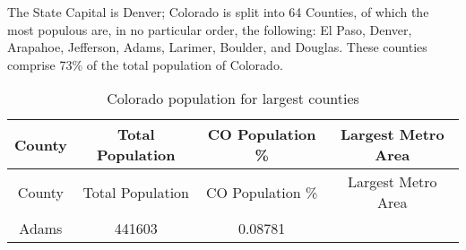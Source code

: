 \documentclass[12pt,twoside]{reedthesis}
\begin{document}
  The State Capital is Denver; Colorado is split into 64 Counties, of
  which the most populous are, in no particular order, the following: El
  Paso, Denver, Arapahoe, Jefferson, Adams, Larimer, Boulder, and Douglas.
  These counties comprise 73\% of the total population of Colorado.
  
  \begin{longtable}[]{@{}cccc@{}}
  \caption{Colorado population for largest counties
  \label{tab:pop_table}}\tabularnewline
  \toprule
  \begin{minipage}[b]{0.13\columnwidth}\centering\strut
  County\strut
  \end{minipage} & \begin{minipage}[b]{0.21\columnwidth}\centering\strut
  Total Population\strut
  \end{minipage} & \begin{minipage}[b]{0.20\columnwidth}\centering\strut
  CO Population \%\strut
  \end{minipage} & \begin{minipage}[b]{0.34\columnwidth}\centering\strut
  Largest Metro Area\strut
  \end{minipage}\tabularnewline
  \midrule
  \endfirsthead
  \toprule
  \begin{minipage}[b]{0.13\columnwidth}\centering\strut
  County\strut
  \end{minipage} & \begin{minipage}[b]{0.21\columnwidth}\centering\strut
  Total Population\strut
  \end{minipage} & \begin{minipage}[b]{0.20\columnwidth}\centering\strut
  CO Population \%\strut
  \end{minipage} & \begin{minipage}[b]{0.34\columnwidth}\centering\strut
  Largest Metro Area\strut
  \end{minipage}\tabularnewline
  \midrule
  \endhead
  \begin{minipage}[t]{0.13\columnwidth}\centering\strut
  Adams\strut
  \end{minipage} & \begin{minipage}[t]{0.21\columnwidth}\centering\strut
  441603\strut
  \end{minipage} & \begin{minipage}[t]{0.20\columnwidth}\centering\strut
  0.08781\strut
  \end{minipage} & \begin{minipage}[t]{0.34\columnwidth}\centering\strut

\end{minipage}
\end{longtable}
\end{document}
